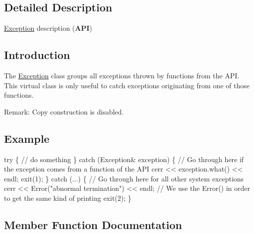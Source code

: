 \subsection{Detailed Description}
\hyperlink{classHurricane_1_1Exception}{Exception} description ({\bfseries A\+PI}) 

\hypertarget{classHurricane_1_1Exception_secExceptionIntro}{}\subsection{Introduction}\label{classHurricane_1_1Exception_secExceptionIntro}
The \hyperlink{classHurricane_1_1Exception}{Exception} class groups all exceptions thrown by functions from the A\+PI. This virtual class is only useful to catch exceptions originating from one of those functions.

\begin{DoxyParagraph}{Remark\+:}
Copy construction is disabled.
\end{DoxyParagraph}
\hypertarget{classHurricane_1_1Exception_secExceptionExample}{}\subsection{Example}\label{classHurricane_1_1Exception_secExceptionExample}

\begin{DoxyCode}
\textcolor{keywordflow}{try} \{
   \textcolor{comment}{// do something}
\}
\textcolor{keywordflow}{catch} (Exception& exception) \{
   \textcolor{comment}{// Go through here if the exception comes from a function of the API}
   cerr << exception.what() << endl;
   exit(1);
\}
\textcolor{keywordflow}{catch} (...) \{
   \textcolor{comment}{// Go through here for all other system exceptions}
   cerr << Error(\textcolor{stringliteral}{"abnormal termination"}) << endl;
   \textcolor{comment}{// We use the Error() in order to get the same kind of printing}
   exit(2);
\}
\end{DoxyCode}
 

\subsection{Member Function Documentation}
\mbox{\label{classHurricane_1_1Exception_a6d8036af345628567494eeab9c8e2e3a}} 
